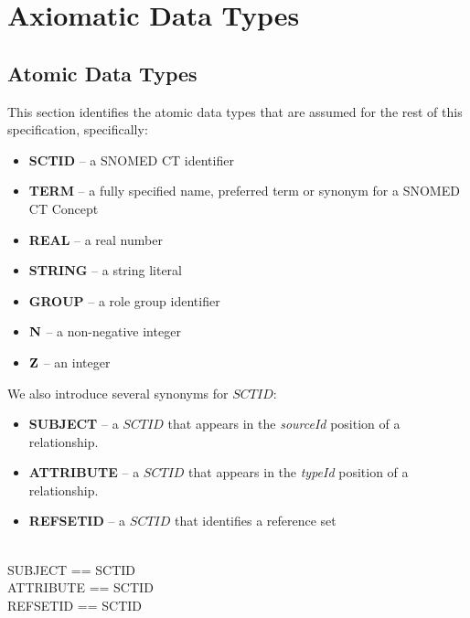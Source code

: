 \documentclass{article}
\begin{document}
\tableofcontents

\section{Axiomatic Data Types}
\subsection{Atomic Data Types}
This section identifies the atomic data types that are assumed for the rest of this specification, specifically:
\begin{itemize}[noitemsep]
\item \textbf{SCTID} -- a SNOMED CT identifier
\item \textbf{TERM} --  a  fully specified name, preferred term or synonym for a SNOMED CT Concept
\item \textbf{REAL} --  a real number
\item \textbf{STRING} -- a string literal
\item \textbf{GROUP} -- a role group identifier
\item \textbf{${\mathbf{N}}$} -- a non-negative integer
\item \textbf{${\mathbf{Z}}$} -- an integer
\end{itemize}


We also introduce several synonyms for $SCTID$:
\begin{itemize}[noitemsep]
\item \textbf{SUBJECT} -- a $SCTID$ that appears in the \emph{sourceId} position of a relationship.
\item \textbf{ATTRIBUTE} -- a $SCTID$ that appears in the \emph{typeId} position of a relationship.
\item \textbf{REFSETID} -- a $SCTID$ that identifies a reference set
\end{itemize}

\begin{zed}
 \\
\also
SUBJECT == SCTID \\
ATTRIBUTE == SCTID \\
REFSETID == SCTID 
\end{zed}
\end{document}
